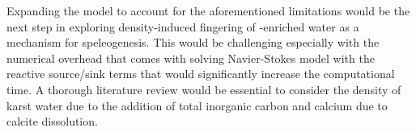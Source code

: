 Expanding the model to account for the aforementioned limitations would be the next step in exploring density-induced fingering 
of -enriched water as a mechanism for speleogenesis. This would be challenging especially with the numerical overhead 
that comes with solving Navier-Stokes model with the reactive source/sink terms that would significantly increase the computational time. 
A thorough literature review would be essential to consider the density of karst water due to the addition of total inorganic carbon and calcium due to 
calcite dissolution.


\endinput
